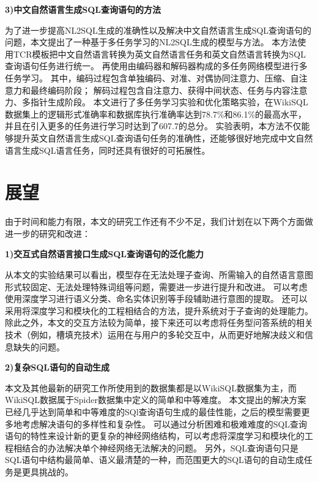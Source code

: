 \textbf{3)中文自然语言生成SQL查询语句的方法}

为了进一步提高NL2SQL生成的准确性以及解决中文自然语言生成SQL查询语句的问题，本文提出了一种基于多任务学习的NL2SQL生成的模型与方法。
本方法使用TCR模板把中文自然语言转换为英文自然语言任务和英文自然语言转换为SQL查询语句任务进行统一。
再使用由编码器和解码器构成的多任务网络模型进行多任务学习。
其中，编码过程包含单独编码、对准、对偶协同注意力、压缩、自注意力和最终编码阶段；
解码过程包含自注意力、获得中间状态、任务与内容注意力、多指针生成阶段。
本文进行了多任务学习实验和优化策略实验，在WikiSQL数据集上的逻辑形式准确率和数据库执行准确率达到78.7\%和86.1\%的最高水平，并且在引入更多的任务进行学习时达到了607.7的总分。
实验表明，本方法不仅能够提升英文自然语言生成SQL查询语句任务的准确性，还能够很好地完成中文自然语言生成SQL语言任务，同时还具有很好的可拓展性。


\section{展望}

由于时间和能力有限，本文的研究工作还有不少不足，我们计划在以下两个方面做进一步的研究和改进：

\textbf{1)交互式自然语言接口生成SQL查询语句的泛化能力}

从本文的实验结果可以看出，模型存在无法处理子查询、所需输入的自然语言意图形式较固定、无法处理特殊词组等问题，需要进一步进行提升和改进。
可以考虑使用深度学习进行语义分类、命名实体识别等手段辅助进行意图的提取。
还可以采用将深度学习和模块化的工程相结合的方法，提升系统对于子查询的处理能力。
除此之外，本文的交互方法较为简单，接下来还可以考虑将任务型问答系统的相关技术（例如，槽填充技术）运用在与用户的多轮交互中，从而更好地解决歧义和信息缺失的问题。


\textbf{2)复杂SQL语句的自动生成}

本文及其他最新的研究工作所使用到的数据集都是以WikiSQL数据集为主，而WikiSQL数据属于Spider数据集中定义的简单和中等难度。
本文提出的解决方案已经几乎达到简单和中等难度的SQl查询语句生成的最佳性能，之后的模型需要更多地考虑解决语句的多样性和复杂性。
可以通过分析困难和极难难度的SQL查询语句的特性来设计新的更复杂的神经网络结构，可以考虑将深度学习和模块化的工程相结合的办法解决单个神经网络无法解决的问题。
另外，SQL查询语句只是SQL语句中结构最简单、语义最清楚的一种，而范围更大的SQL语句的自动生成任务是更具挑战的。

